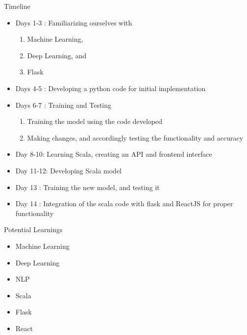 \documentclass{beamer}
\begin{document}
\begin{frame}{Timeline}
    \begin{itemize}
        \item Days 1-3 : Familiarizing ourselves with
        \begin{enumerate}
            \item Machine Learning,
            \item Deep Learning, and
            \item Flask
        \end{enumerate}
        \item Days 4-5 : Developing a python code for initial implementation
        \item Days 6-7 : Training and Testing
            \begin{enumerate}
                \item Training the model using the code developed
                \item Making changes, and accordingly testing the functionality and accuracy
            \end{enumerate}
        \item Day 8-10: Learning Scala, creating an API and frontend interface
        \item Day 11-12: Developing Scala model
        \item Day 13 : Training the new model, and testing it
        \item Day 14 : Integration of the scala code with flask and ReactJS for proper functionality
    \end{itemize}
\end{frame}

\begin{frame}{Potential Learnings}
    \begin{itemize}
                \item Machine Learning
                \item Deep Learning
                \item NLP
                \item Scala
                \item Flask
                \item React
            \end{itemize}

\end{frame}


\end{document}
